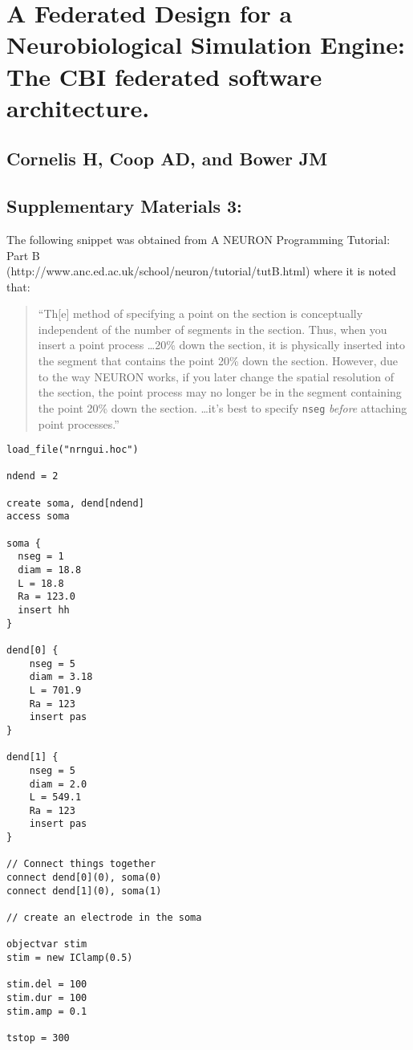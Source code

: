 \documentclass[10pt]{article}
\begin{document}
\section*{A Federated Design for a Neurobiological Simulation Engine: 
The CBI federated software architecture.}
\subsection*{Cornelis H, Coop AD, and Bower JM}
\subsection*{Supplementary Materials 3:} 

The following snippet was obtained from A NEURON Programming Tutorial: Part B\\ 
(http://www.anc.ed.ac.uk/school/neuron/tutorial/tutB.html) where it is noted that: 

\begin{quote}
``Th[e] method of specifying a point on the section is conceptually independent of the number of segments in the section. Thus, when you insert a point process \ldots 20\% down the section, it is physically inserted into the segment that contains the point 20\% down the section. However, due to the way NEURON works, if you later change the spatial resolution of the section, the point process may no longer be in the segment containing the point 20\% down the section. \ldots it's best to specify {\tt nseg} {\it before} attaching point processes.''
\end{quote}

\begin{linenumbers}
\begin{verbatim}
load_file("nrngui.hoc")

ndend = 2

create soma, dend[ndend]
access soma

soma {
  nseg = 1
  diam = 18.8
  L = 18.8
  Ra = 123.0
  insert hh
}

dend[0] {
    nseg = 5
    diam = 3.18
    L = 701.9
    Ra = 123
    insert pas
}

dend[1] {
    nseg = 5
    diam = 2.0
    L = 549.1
    Ra = 123
    insert pas
}

// Connect things together
connect dend[0](0), soma(0)
connect dend[1](0), soma(1)

// create an electrode in the soma

objectvar stim
stim = new IClamp(0.5)

stim.del = 100
stim.dur = 100
stim.amp = 0.1

tstop = 300

\end{verbatim}
\end{linenumbers}
\end{document}
